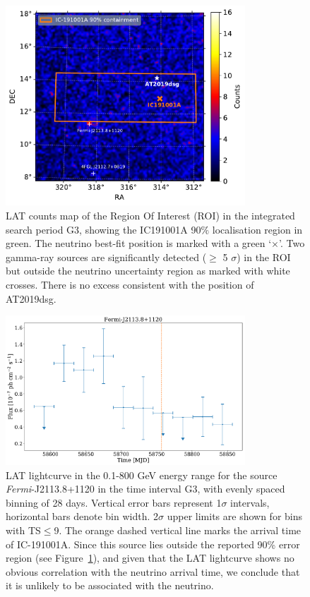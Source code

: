 \documentclass{nature_plusfigure}
\begin{document}
\begin{methods}
\begin{figure}
    \centering
    \includegraphics[width=0.8\textwidth]{LAT_countsmap.pdf}
    \caption{LAT counts map of the Region Of Interest (ROI) in the integrated search period G3, showing the IC191001A 90$\%$ localisation region in green. The neutrino best-fit position is marked with a green `$\times$'. Two gamma-ray sources are significantly detected ($\geq$ 5 $\sigma$) in the ROI but outside the neutrino uncertainty region as marked with white crosses. There is no excess consistent with the position of AT2019dsg. %
    }
    \label{fig:fermi}
\end{figure}

\begin{figure}
    \centering
    \includegraphics[width=0.8\textwidth]{figures/fermi_lightcurve}
    \caption{LAT lightcurve in the 0.1-800 GeV energy range for the source \textit{Fermi}-J2113.8+1120 in the time interval G3, with evenly spaced binning of 28 days. Vertical error bars represent 1$\sigma$ intervals, horizontal bars denote bin width. 2$\sigma$ upper limits are shown for bins with TS$\leq$9. The orange dashed vertical line marks the arrival time of IC-191001A. Since this source lies outside the reported 90\% error region (see Figure~\ref{fig:fermi}), and given that the LAT lightcurve shows no obvious correlation with the neutrino arrival time, we conclude that it is unlikely to be associated with the neutrino.}
    \label{fig:fermi_lc}
\end{figure}
\clearpage


\end{methods}
\end{document}
